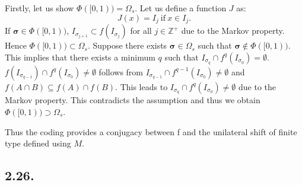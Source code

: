 \documentclass[a4paper,11pt,fleqn]{article}
\begin{document}
Firstly, let us show $\Phi([0,1))=\Omega_s$. 
Let us define a function $J$ as: 
\begin{equation}
    J(x) = I_j \ \text{if} \ x\in I_j. 
\end{equation}
\fi
If ${\bm \sigma}\in\Phi([0,1))$,  $I_{\sigma_{j+1}} \subset f(I_{\sigma_j})$ for all $j\in\mathbb{Z}^+$ due to the Markov property. Hence $\Phi([0,1))\subset \Omega_s$. Suppose there exists ${\bm \sigma}\in \Omega_s$ such that ${\bm \sigma} \notin \Phi([0,1))$. This implies that there exists a minimum $q$ such that $I_{\sigma_q} \cap f^q(I_{\sigma_0}) = \emptyset$. $f(I_{\sigma_{q-1}}) \cap f^{q}(I_{\sigma_0}) \neq \emptyset$ follows from $I_{\sigma_{q-1}} \cap f^{q-1}(I_{\sigma_0}) \neq \emptyset$ and $f(A\cap B) \subseteq f(A) \cap f(B)$. This leads to $I_{\sigma_q} \cap f^q(I_{\sigma_0}) \neq \emptyset$ due to the Markov property. This contradicts the assumption and thus we obtain $\Phi([0,1))\supset \Omega_s$. 

Thus the coding provides a conjugacy between f and the unilateral shift of finite type defined using $M$.  
\hruleskip

\subsection{2.26.}
\end{document}
